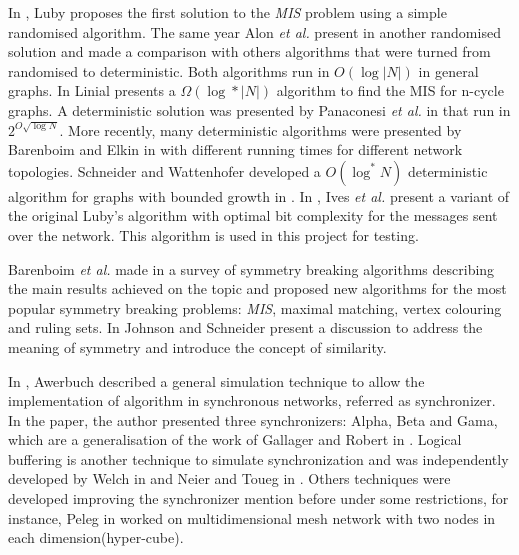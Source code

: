 In \cite{luby1986simple}, Luby proposes the first solution to the \textit{MIS} problem using a simple randomised algorithm. The same year Alon \textit{et al.} present in \cite{alon1986fast} another randomised solution and made a comparison with others algorithms that were turned from randomised to deterministic. Both algorithms run in $O(\log |N|)$ in general graphs. In \cite{linial1992locality} Linial presents a $\Omega(\log* |N|)$ algorithm to find the MIS for n-cycle graphs. A deterministic solution was presented by Panaconesi \textit{et al.} in \cite{panconesi1996complexity} that run in $2^{O\sqrt{\log N}}$. More recently, many deterministic algorithms were presented by Barenboim and Elkin in \cite{barenboim2010sublogarithmic} with different running times for different network topologies. Schneider and Wattenhofer developed a $O(\log^* N)$ deterministic algorithm for graphs with bounded growth in \cite{barenboim2010sublogarithmic}. In \cite{yves2009optimal}, Ives \textit{et al.} present a variant of the original Luby's algorithm with optimal bit complexity for the messages sent over the network. This algorithm is used in this project for testing.

 Barenboim \textit{et al.} made in \cite{barenboim2016locality} a survey of symmetry breaking algorithms describing the main results achieved on the topic and proposed new algorithms for the most popular symmetry breaking problems: \textit{MIS}, maximal matching, vertex colouring and ruling sets. In \cite{johnson1985symmetry} Johnson and Schneider present a discussion to address the meaning of symmetry and introduce the concept of similarity.  
 

In \cite{awerbuch1985complexity}, Awerbuch described a general simulation technique to allow the implementation of algorithm in synchronous networks, referred as synchronizer. In the paper, the author presented three synchronizers: Alpha, Beta and Gama, which are a generalisation of the work of Gallager and Robert in \cite{gallager1982distributed}. Logical buffering is another technique to simulate synchronization and was independently developed by Welch in \cite{welch1987simulating} and Neier and Toueg in \cite{neiger1993simulating}. Others techniques were developed improving the synchronizer mention before under some restrictions, for instance, Peleg in \cite{peleg1989optimal} worked on multidimensional mesh network with two nodes in each dimension(hyper-cube).
